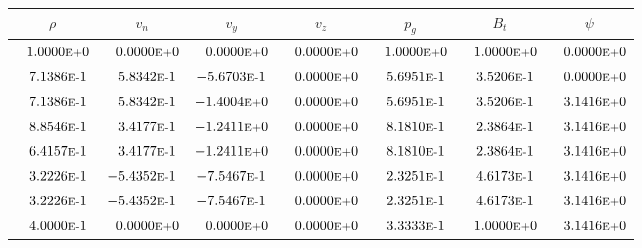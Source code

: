 \begin{tabular*}{\textwidth}{@{\extracolsep{\fill}} ccccccc}
\\ 
\hline 
\hline 
$\rho$ & $v_n$ & $v_y$ & $v_z$ & $p_g$ & $B_t$ & $\psi$ \\ 
\hline 
$\phantom{-} 1.0000\mbox{\sc{e}\smaller{+}}0$ & $\phantom{-} 0.0000\mbox{\sc{e}\smaller{+}}0$ & $\phantom{-} 0.0000\mbox{\sc{e}\smaller{+}}0$ & $\phantom{-} 0.0000\mbox{\sc{e}\smaller{+}}0$ & $\phantom{-} 1.0000\mbox{\sc{e}\smaller{+}}0$ & $\phantom{-} 1.0000\mbox{\sc{e}\smaller{+}}0$ & $\phantom{-} 0.0000\mbox{\sc{e}\smaller{+}}0$ \\ 
$\phantom{-} 7.1386\mbox{\sc{e}\smaller{-}}1$ & $\phantom{-} 5.8342\mbox{\sc{e}\smaller{-}}1$ & $-5.6703\mbox{\sc{e}\smaller{-}}1$ & $\phantom{-} 0.0000\mbox{\sc{e}\smaller{+}}0$ & $\phantom{-} 5.6951\mbox{\sc{e}\smaller{-}}1$ & $\phantom{-} 3.5206\mbox{\sc{e}\smaller{-}}1$ & $\phantom{-} 0.0000\mbox{\sc{e}\smaller{+}}0$ \\ 
$\phantom{-} 7.1386\mbox{\sc{e}\smaller{-}}1$ & $\phantom{-} 5.8342\mbox{\sc{e}\smaller{-}}1$ & $-1.4004\mbox{\sc{e}\smaller{+}}0$ & $\phantom{-} 0.0000\mbox{\sc{e}\smaller{+}}0$ & $\phantom{-} 5.6951\mbox{\sc{e}\smaller{-}}1$ & $\phantom{-} 3.5206\mbox{\sc{e}\smaller{-}}1$ & $\phantom{-} 3.1416\mbox{\sc{e}\smaller{+}}0$ \\ 
$\phantom{-} 8.8546\mbox{\sc{e}\smaller{-}}1$ & $\phantom{-} 3.4177\mbox{\sc{e}\smaller{-}}1$ & $-1.2411\mbox{\sc{e}\smaller{+}}0$ & $\phantom{-} 0.0000\mbox{\sc{e}\smaller{+}}0$ & $\phantom{-} 8.1810\mbox{\sc{e}\smaller{-}}1$ & $\phantom{-} 2.3864\mbox{\sc{e}\smaller{-}}1$ & $\phantom{-} 3.1416\mbox{\sc{e}\smaller{+}}0$ \\ 
$\phantom{-} 6.4157\mbox{\sc{e}\smaller{-}}1$ & $\phantom{-} 3.4177\mbox{\sc{e}\smaller{-}}1$ & $-1.2411\mbox{\sc{e}\smaller{+}}0$ & $\phantom{-} 0.0000\mbox{\sc{e}\smaller{+}}0$ & $\phantom{-} 8.1810\mbox{\sc{e}\smaller{-}}1$ & $\phantom{-} 2.3864\mbox{\sc{e}\smaller{-}}1$ & $\phantom{-} 3.1416\mbox{\sc{e}\smaller{+}}0$ \\ 
$\phantom{-} 3.2226\mbox{\sc{e}\smaller{-}}1$ & $-5.4352\mbox{\sc{e}\smaller{-}}1$ & $-7.5467\mbox{\sc{e}\smaller{-}}1$ & $\phantom{-} 0.0000\mbox{\sc{e}\smaller{+}}0$ & $\phantom{-} 2.3251\mbox{\sc{e}\smaller{-}}1$ & $\phantom{-} 4.6173\mbox{\sc{e}\smaller{-}}1$ & $\phantom{-} 3.1416\mbox{\sc{e}\smaller{+}}0$ \\ 
$\phantom{-} 3.2226\mbox{\sc{e}\smaller{-}}1$ & $-5.4352\mbox{\sc{e}\smaller{-}}1$ & $-7.5467\mbox{\sc{e}\smaller{-}}1$ & $\phantom{-} 0.0000\mbox{\sc{e}\smaller{+}}0$ & $\phantom{-} 2.3251\mbox{\sc{e}\smaller{-}}1$ & $\phantom{-} 4.6173\mbox{\sc{e}\smaller{-}}1$ & $\phantom{-} 3.1416\mbox{\sc{e}\smaller{+}}0$ \\ 
$\phantom{-} 4.0000\mbox{\sc{e}\smaller{-}}1$ & $\phantom{-} 0.0000\mbox{\sc{e}\smaller{+}}0$ & $\phantom{-} 0.0000\mbox{\sc{e}\smaller{+}}0$ & $\phantom{-} 0.0000\mbox{\sc{e}\smaller{+}}0$ & $\phantom{-} 3.3333\mbox{\sc{e}\smaller{-}}1$ & $\phantom{-} 1.0000\mbox{\sc{e}\smaller{+}}0$ & $\phantom{-} 3.1416\mbox{\sc{e}\smaller{+}}0$ \\ 
\hline 
\end{tabular*} 
